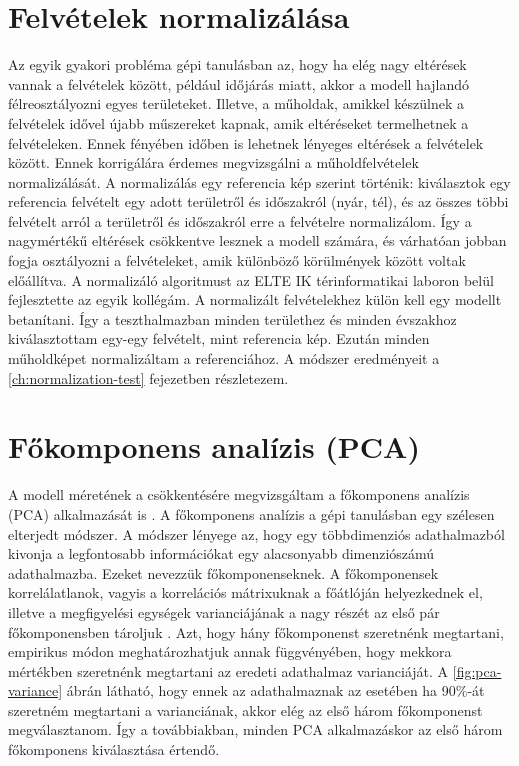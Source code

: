\section{Felvételek normalizálása}

Az egyik gyakori probléma gépi tanulásban az, hogy ha elég nagy eltérések vannak a felvételek között, például időjárás miatt, akkor a modell hajlandó félreosztályozni egyes területeket. Illetve, a műholdak, amikkel készülnek a felvételek idővel újabb műszereket kapnak, amik eltéréseket termelhetnek a felvételeken. Ennek fényében időben is lehetnek lényeges eltérések a felvételek között. Ennek korrigálára érdemes megvizsgálni a műholdfelvételek normalizálását. A normalizálás egy referencia kép szerint történik: kiválasztok egy referencia felvételt egy adott területről és időszakról (nyár, tél), és az összes többi felvételt arról a területről és időszakról erre a felvételre normalizálom. Így a nagymértékű eltérések csökkentve lesznek a modell számára, és várhatóan jobban fogja osztályozni a felvételeket, amik különböző körülmények között voltak előállítva. A normalizáló algoritmust az ELTE IK térinformatikai laboron belül fejlesztette az egyik kollégám.
A normalizált felvételekhez külön kell egy modellt betanítani. Így a teszthalmazban minden területhez és minden évszakhoz kiválasztottam egy-egy felvételt, mint referencia kép. Ezután minden műholdképet normalizáltam a referenciához. A módszer eredményeit a \ref{ch:normalization-test} fejezetben részletezem.

\section{Főkomponens analízis (PCA)}
\label{ch:pca-methodology}

A modell méretének a csökkentésére megvizsgáltam a főkomponens analízis (PCA) alkalmazását is \cite{pca2010}. A főkomponens analízis a gépi tanulásban egy szélesen elterjedt módszer.  A módszer lényege az, hogy egy többdimenziós adathalmazból kivonja a legfontosabb információkat egy alacsonyabb dimenziószámú adathalmazba. Ezeket nevezzük főkomponenseknek. A főkomponensek korrelálatlanok, vagyis a korrelációs mátrixuknak a főátlóján helyezkednek el, illetve a megfigyelési egységek varianciájának a nagy részét az első pár főkomponensben tároljuk \cite{elek2011}. Azt, hogy hány főkomponenst szeretnénk megtartani, empirikus módon meghatározhatjuk annak függvényében, hogy mekkora mértékben szeretnénk megtartani az eredeti adathalmaz varianciáját. A \ref{fig:pca-variance} ábrán látható, hogy ennek az adathalmaznak az esetében ha 90\%-át szeretném megtartani a varianciának, akkor elég az első három főkomponenst megválasztanom. Így a továbbiakban, minden PCA alkalmazáskor az első három főkomponens kiválasztása értendő.

